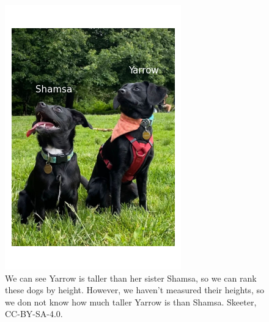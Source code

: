 \documentclass[
]{book}
\begin{document}
\begin{figure}
\includegraphics[width=0.75\linewidth]{images/03-dogs-ordinal} \caption{We can see Yarrow is taller than her sister Shamsa, so we can rank these dogs by height. However, we haven't measured their heights, so we don not know how much taller Yarrow is than Shamsa. Skeeter, CC-BY-SA-4.0.}\label{fig:3-dogs-ordinal}
\end{figure}
\end{document}
